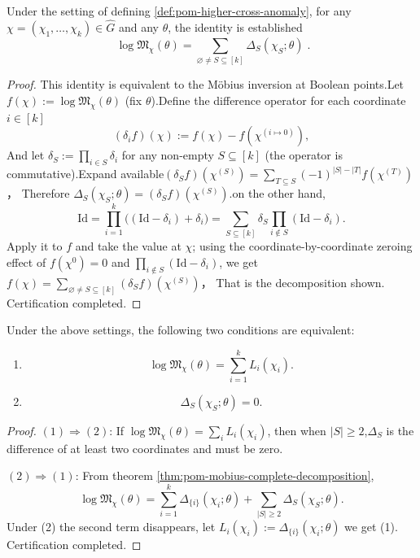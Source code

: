 \begin{theorem}\label{thm:pom-mobius-complete-decomposition}Under the setting of defining \ref{def:pom-higher-cross-anomaly}, for any \(\chi=(\chi_1,\dots,\chi_k)\in\widehat G\) and any \(\theta\), the identity is established\[
\boxed{\;
\log\mathfrak{M}_\chi(\theta)
=\sum_{\varnothing\neq S\subseteq[k]}\Delta_S(\chi_S;\theta)\; }.
\]
\end{theorem}
\begin{proof}
This identity is equivalent to the Möbius inversion at Boolean points.Let \(f(\chi):=\log\mathfrak{M}_\chi(\theta)\) (fix \(\theta\)).Define the difference operator for each coordinate \(i\in[k]\)\[
(\delta_i f)(\chi):=f(\chi)-f(\chi^{(i\mapsto 0)}),
\]
And let \(\delta_S:=\prod_{i\in S}\delta_i\) for any non-empty \(S\subseteq[k]\) (the operator is commutative).Expand available\(
(\delta_S f)(\chi^{(S)})=\sum_{T\subseteq S}(-1)^{|S|-|T|}f(\chi^{(T)})
\)，
Therefore \(\Delta_S(\chi_S;\theta)=(\delta_S f)(\chi^{(S)})\).on the other hand,\[
\mathrm{Id}=\prod_{i=1}^k\bigl((\mathrm{Id}-\delta_i)+\delta_i\bigr)
=\sum_{S\subseteq[k]}\delta_S\prod_{i\notin S}(\mathrm{Id}-\delta_i).
\]
Apply it to \(f\) and take the value at \(\chi\); using the coordinate-by-coordinate zeroing effect of \(f(\chi^0)=0\) and \(\prod_{i\notin S}(\mathrm{Id}-\delta_i)\), we get\(
f(\chi)=\sum_{\varnothing\neq S\subseteq[k]}(\delta_S f)(\chi^{(S)})
\)，
That is the decomposition shown. Certification completed.\end{proof}

\begin{theorem}\label{thm:pom-axis-decomposability-iff}Under the above settings, the following two conditions are equivalent:\begin{enumerate}
\item  \[
  \log\mathfrak{M}_{\chi}(\theta)=\sum_{i=1}^k L_i(\chi_i).
  \]
\item  \[
  \Delta_S(\chi_S;\theta)=0.
  \]
\end{enumerate}
\end{theorem}
\begin{proof}
\((1)\Rightarrow(2)\): If \(\log\mathfrak{M}_\chi(\theta)=\sum_i L_i(\chi_i)\), then when \(|S|\ge 2\),\(\Delta_S\) is the difference of at least two coordinates and must be zero.\par
\((2)\Rightarrow(1)\): From theorem \ref{thm:pom-mobius-complete-decomposition},\[
\log\mathfrak{M}_\chi(\theta)=\sum_{i=1}^k\Delta_{\{i\}}(\chi_i;\theta)+\sum_{|S|\ge 2}\Delta_S(\chi_S;\theta).
\]
Under (2) the second term disappears, let \(L_i(\chi_i):=\Delta_{\{i\}}(\chi_i;\theta)\) we get (1). Certification completed.\end{proof}


